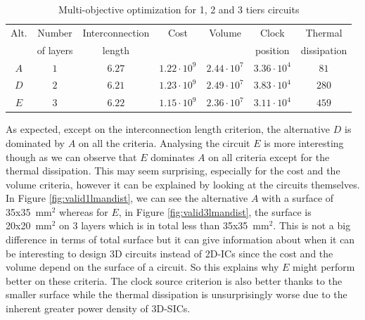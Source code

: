 \begin{table}[h!]
\caption{Multi-objective optimization for 1, 2 and 3 tiers circuits}
\begin{center}
\begin{footnotesize}
\begin{tabular}{|c|c|ccccc|}
\hline
Alt. & Number & Interconnection & Cost & Volume & Clock & Thermal\\
 & of layers & length & & & position & dissipation\\
\hline
$A$ & $1$ & $6.27$ & $1.22\cdot10^9$ & $2.44\cdot 10^7$ & $3.36\cdot 10^4$ & $81$ \\
$D$ & $2$ & $6.21$ & $1.23\cdot10^9$ & $2.49\cdot 10^7$ & $3.83\cdot 10^4$ & $280$ \\
$E$ & $3$ & $6.22$ & $1.15\cdot10^9$ & $2.36\cdot 10^7$ & $3.11\cdot 10^4$ & $459$ \\
\hline
\end{tabular}
\end{footnotesize}
\end{center}
\label{tab:validade}
\end{table}

As expected, except on the interconnection length criterion, the alternative $D$ is dominated by $A$ on all the criteria. Analysing the circuit $E$ is more interesting though as we can observe that $E$ dominates $A$ on all criteria except for the thermal dissipation. This may seem surprising, especially for the cost and the volume criteria, however it can be explained by looking at the circuits themselves. In Figure \ref{fig:valid1lmandist}, we can see the alternative $A$ with a surface of \texttildelow 35x35~mm$^2$ whereas for $E$, in Figure \ref{fig:valid3lmandist}, the surface is \texttildelow 20x20~mm$^2$ on 3 layers which is in total less than 35x35~mm$^2$. This is not a big difference in terms of total surface but it can give information about when it can be interesting to design 3D circuits instead of 2D-ICs since the cost and the volume depend on the surface of a circuit. So this explains why $E$ might perform better on these criteria. The clock source criterion is also better thanks to the smaller surface while the thermal dissipation is unsurprisingly worse due to the inherent greater power density of 3D-SICs. 

